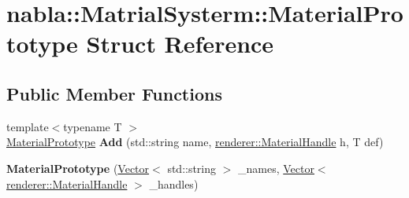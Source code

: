 \hypertarget{structnabla_1_1_matrial_systerm_1_1_material_prototype}{}\section{nabla\+::Matrial\+Systerm\+::Material\+Prototype Struct Reference}
\label{structnabla_1_1_matrial_systerm_1_1_material_prototype}
\subsection*{Public Member Functions}
\begin{DoxyCompactItemize}
\item 
\mbox{\label{structnabla_1_1_matrial_systerm_1_1_material_prototype_a0421b3e72ea4716509210b7edee45149}} 
{\footnotesize template$<$typename T $>$ }\\\mbox{\hyperlink{structnabla_1_1_matrial_systerm_1_1_material_prototype}{Material\+Prototype}} {\bfseries Add} (std\+::string name, \mbox{\hyperlink{classnabla_1_1renderer_1_1_handle}{renderer\+::\+Material\+Handle}} h, T def)
\item 
\mbox{\label{structnabla_1_1_matrial_systerm_1_1_material_prototype_ad945363ba3d0618191b109c8b5d6e7a8}} 
{\bfseries Material\+Prototype} (\mbox{\hyperlink{classnabla_1_1_s_t_l_vector_ex}{Vector}}$<$ std\+::string $>$ \+\_\+names, \mbox{\hyperlink{classnabla_1_1_s_t_l_vector_ex}{Vector}}$<$ \mbox{\hyperlink{classnabla_1_1renderer_1_1_handle}{renderer\+::\+Material\+Handle}} $>$ \+\_\+handles)
\end{DoxyCompactItemize}
